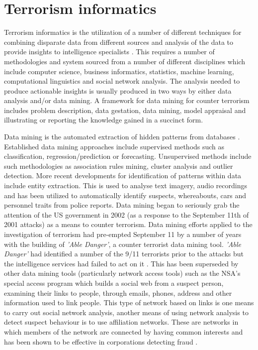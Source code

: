 \section{Terrorism informatics}

Terrorism informatics is the utilization of a number of different techniques for combining disparate data from different sources and analysis of the data to provide insights to intelligence specialists \citep{chau2015intelligence}. This requires a number of methodologies and system sourced from a number of different disciplines which include computer science, business informatics, statistics, machine learning, computational linguistics and social network analysis. The analysis needed to produce actionable insights is usually produced in two ways by either data analysis and/or data mining. A framework for data mining for counter terrorism  includes problem description, data gestation, data mining, model appraisal and illustrating or reporting the knowledge gained in a succinct form.

Data mining is the automated extraction of hidden patterns from databases \citep{shmueli2016data}. Established data mining approaches include supervised methods such as  classification, regression/prediction or forecasting. Unsupervised methods include such methodologies as association rules mining, cluster analysis and outlier detection. More recent developments for identification of patterns within data include entity extraction. This is used to analyse text imagery, audio recordings and has been utilized to automatically identify suspects, whereabouts, cars and personnel traits from police reports. Data mining began to seriously grab the attention of the US government in 2002 (as a response to the September 11th of 2001 attacks) as a means to counter terrorism. Data mining efforts applied to the investigation of terrorism had pre-empted September 11 by a number of years with the building of \textit{'Able Danger'}, a counter terrorist data mining tool. \textit{'Able Danger'} \citep{keefe2006can} had identified a number of the 9/11 terrorists prior to the attacks but the intelligence services had failed to act on it \citep{lance2006triple}. This has been superseded by other data mining tools (particularly network access tools) such as the NSA's special access program which builds a social web from a suspect person, examining their links to people, through emails, phones, address and other information used to link people. This type of network based on links is one means to carry out social network analysis, another means of using network analysis to detect suspect behaviour is to use affiliation networks. These are networks in which members of the network are connected by having common interests and has been shown to be effective in corporations detecting fraud \citep{ben2009organised}.


